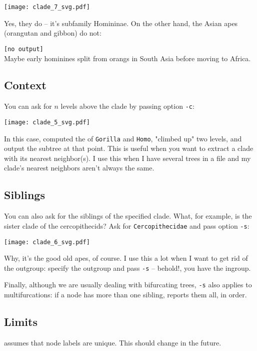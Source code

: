 
\begin{center}
  \texttt{[image: clade\_7\_svg.pdf]}
\end{center}

\noindent{}Yes, they do -- it's subfamily Homininae. On the other hand, the Asian apes (orangutan and gibbon) do not:


\verb+[no output]+ \\

\noindent{}Maybe early hominines split from orangs in South Asia before moving to Africa.

\subsection{Context}

You can ask for $n$ levels above the clade by passing option \texttt{-c}: 


\begin{center}
  \texttt{[image: clade\_5\_svg.pdf]}
\end{center}

\noindent{}In this case, \clade{} computed the \lca{} of \texttt{Gorilla} and
\texttt{Homo}, "climbed up" two levels, and output the subtree at that point.
This is useful when you want to extract a clade with its nearest neighbor(s). I
use this when I have several trees in a file and my clade's nearest neighbors
aren't always the same.

\subsection{Siblings}

You can also ask for the siblings of the specified clade. What, for example, is
the sister clade of the cercopithecids? Ask for \texttt{Cercopithecidae} and
pass option \texttt{-s}:


\begin{center}
  \texttt{[image: clade\_6\_svg.pdf]}
\end{center}

\noindent{}Why, it's the good old apes, of course. I use this a lot when I
want to get rid of the outgroup: specify the outgroup and pass \texttt{-s} --
behold!, you have the ingroup.

Finally, although we are usually dealing with bifurcating trees, \texttt{-s}
also applies to multifurcations: if a node has more than one sibling, \clade{} reports them all, in \nw{} order.

\subsection{Limits}

\clade{} assumes that node labels are unique. This should change in the future.

